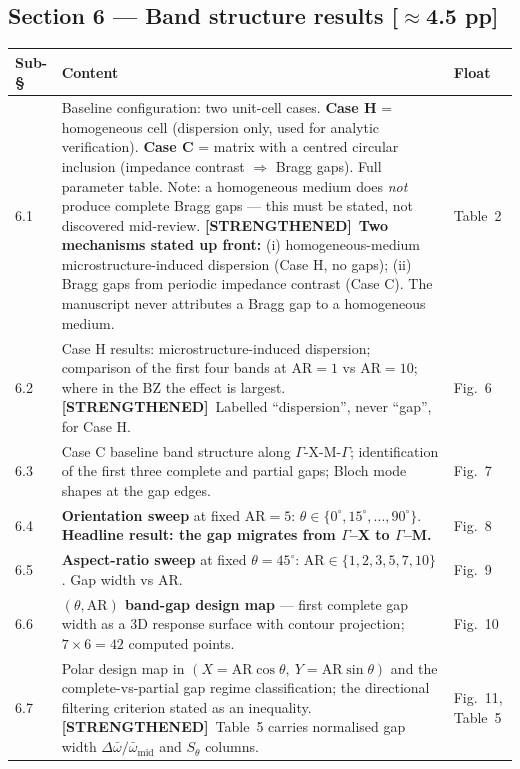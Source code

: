\documentclass[11pt,a4paper]{article}
\newcommand{\bp}[1]{\textcolor{accent}{\textsf{\footnotesize [#1]}}}
\newcommand{\STR}{{\color{strcol}\textbf{[STRENGTHENED]}}}
\begin{document}
\subsection{Section 6 --- Band structure results \bp{$\approx$4.5 pp}}

\begin{tabularx}{\textwidth}{@{}L{1.5cm} Y L{3.4cm}@{}}
\toprule
Sub-\S & Content & Float \\
 & Baseline configuration: two unit-cell cases. \textbf{Case H} = homogeneous cell (dispersion only, used for analytic verification). \textbf{Case C} = matrix with a centred circular inclusion (impedance contrast $\Rightarrow$ Bragg gaps). Full parameter table. \textcolor{warn}{Note: a homogeneous medium does \emph{not} produce complete Bragg gaps --- this must be stated, not discovered mid-review.} \STR\ \textbf{Two mechanisms stated up front:} (i) homogeneous-medium microstructure-induced dispersion (Case H, no gaps); (ii) Bragg gaps from periodic impedance contrast (Case C). The manuscript never attributes a Bragg gap to a homogeneous medium. & Table~2 \\
6.2 & Case H results: microstructure-induced dispersion; comparison of the first four bands at $\mathrm{AR}=1$ vs $\mathrm{AR}=10$; where in the BZ the effect is largest. \STR\ Labelled ``dispersion'', never ``gap'', for Case H. & Fig.~6 \\
6.3 & Case C baseline band structure along $\Gamma$-X-M-$\Gamma$; identification of the first three complete and partial gaps; Bloch mode shapes at the gap edges. & Fig.~7 \\
6.4 & \textbf{Orientation sweep} at fixed $\mathrm{AR}=5$: $\theta\in\{0^\circ,15^\circ,\ldots,90^\circ\}$. \textbf{Headline result: the gap migrates from $\Gamma$--X to $\Gamma$--M.} & Fig.~8 \\
6.5 & \textbf{Aspect-ratio sweep} at fixed $\theta=45^\circ$: $\mathrm{AR}\in\{1,2,3,5,7,10\}$. Gap width vs $\mathrm{AR}$. & Fig.~9 \\
6.6 & \textbf{$(\theta,\mathrm{AR})$ band-gap design map} --- first complete gap width as a 3D response surface with contour projection; $7\times6=42$ computed points. & Fig.~10 \\
6.7 & Polar design map in $(X=\mathrm{AR}\cos\theta,\ Y=\mathrm{AR}\sin\theta)$ and the complete-vs-partial gap regime classification; the directional filtering criterion stated as an inequality. \STR\ Table~5 carries normalised gap width $\Delta\bar\omega/\bar\omega_{\mathrm{mid}}$ and $S_\theta$ columns. & Fig.~11, Table~5 \\
\bottomrule
\end{tabularx}
\end{document}
